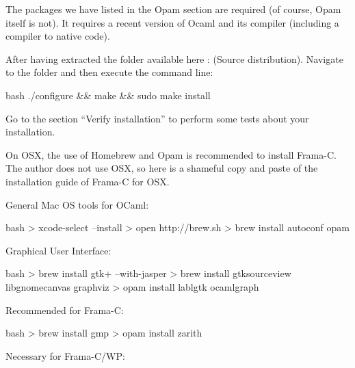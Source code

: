The packages we have listed in the Opam section are required (of course,
Opam itself is not). It requires a recent version of Ocaml and its
compiler (including a compiler to native code).



After having extracted the folder available here :
 (Source distribution).
Navigate to the folder and then execute the command line:



\begin{CodeBlock}{bash}
./configure && make && sudo make install
\end{CodeBlock}



Go to the section ``Verify installation'' to perform some tests about
your installation.





On OSX, the use of Homebrew and Opam is recommended to install Frama-C.
The author does not use OSX, so here is a shameful copy and paste of the
installation guide of Frama-C for OSX.




General Mac OS tools for OCaml:



\begin{CodeBlock}{bash}
> xcode-select --install 
> open http://brew.sh
> brew install autoconf opam 
\end{CodeBlock}



Graphical User Interface:



\begin{CodeBlock}{bash}
> brew install gtk+ --with-jasper
> brew install gtksourceview libgnomecanvas graphviz
> opam install lablgtk ocamlgraph 
\end{CodeBlock}



Recommended for Frama-C:



\begin{CodeBlock}{bash}
> brew install gmp
> opam install zarith
\end{CodeBlock}



Necessary for Frama-C/WP:



